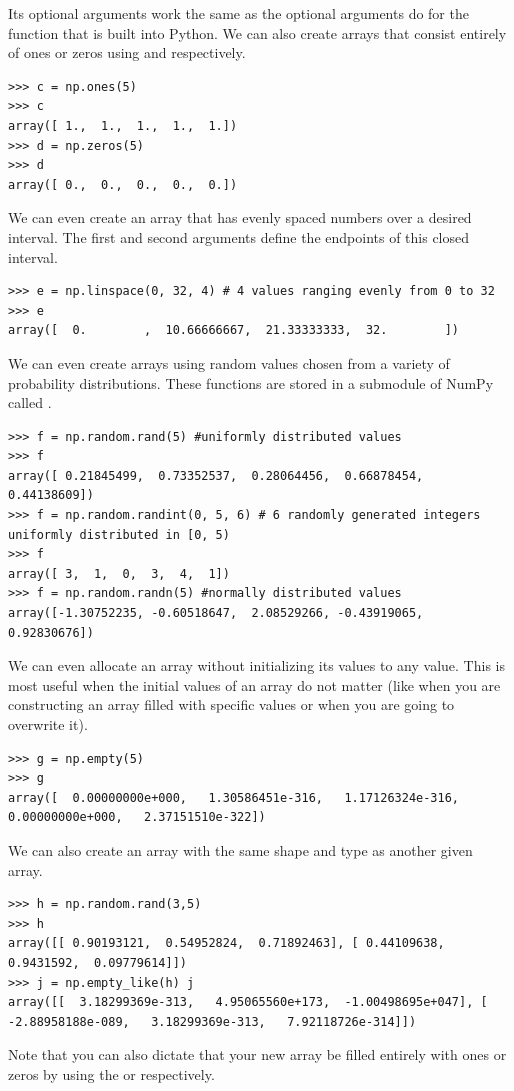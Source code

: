Its optional
arguments work the same as the optional arguments do for the 
function that is built into Python. We can also create arrays that
consist entirely of ones or zeros using  and
 respectively. 
\begin{lstlisting}
>>> c = np.ones(5) 
>>> c
array([ 1.,  1.,  1.,  1.,  1.])
>>> d = np.zeros(5) 
>>> d
array([ 0.,  0.,  0.,  0.,  0.]) 
\end{lstlisting} 

We can even create an
array that has evenly spaced numbers over a desired interval. The first
and second arguments define the endpoints of this closed interval.
\begin{lstlisting}
>>> e = np.linspace(0, 32, 4) # 4 values ranging evenly from 0 to 32 
>>> e
array([  0.        ,  10.66666667,  21.33333333,  32.        ])
\end{lstlisting} 

We can even create arrays using random values chosen
from a variety of probability distributions. These functions are stored
in a submodule of NumPy called . 
\begin{lstlisting}
>>> f = np.random.rand(5) #uniformly distributed values 
>>> f
array([ 0.21845499,  0.73352537,  0.28064456,  0.66878454,  0.44138609])
>>> f = np.random.randint(0, 5, 6) # 6 randomly generated integers uniformly distributed in [0, 5) 
>>> f
array([ 3,  1,  0,  3,  4,  1])
>>> f = np.random.randn(5) #normally distributed values
array([-1.30752235, -0.60518647,  2.08529266, -0.43919065,  0.92830676])
\end{lstlisting} We can even allocate an array without initializing its
values to any value. This is most useful when the initial values of an
array do not matter (like when you are constructing an array filled with
specific values or when you are going to overwrite it).
\begin{lstlisting}
>>> g = np.empty(5) 
>>> g
array([  0.00000000e+000,   1.30586451e-316,   1.17126324e-316,
0.00000000e+000,   2.37151510e-322]) 
\end{lstlisting} 

We can also create an array with the same shape and type as another given array.
\begin{lstlisting}
>>> h = np.random.rand(3,5) 
>>> h
array([[ 0.90193121,  0.54952824,  0.71892463], [ 0.44109638,  0.9431592,  0.09779614]])
>>> j = np.empty_like(h) j
array([[  3.18299369e-313,   4.95065560e+173,  -1.00498695e+047], [
-2.88958188e-089,   3.18299369e-313,   7.92118726e-314]])
\end{lstlisting} 
Note that you can also dictate that your new array be
filled entirely with ones or zeros by using the  or
 respectively.


